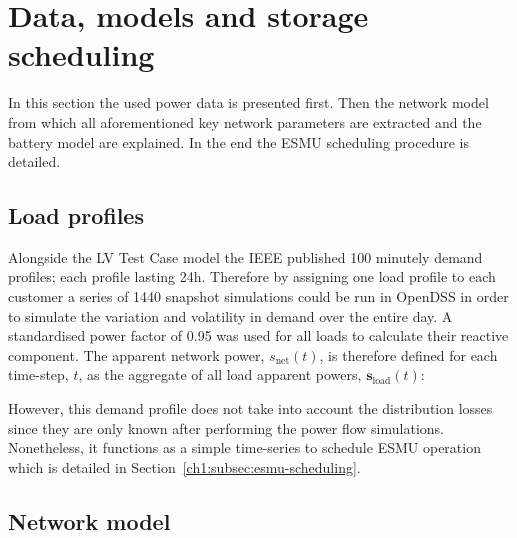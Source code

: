 \section{Data, models and storage scheduling}
\label{ch1:sec:data-and-network-models}

In this section the used power data is presented first.
Then the network model from which all aforementioned key network parameters are extracted and the battery model are explained.
In the end the ESMU scheduling procedure is detailed.

\subsection{Load profiles}
\label{ch1:subsec:load-profiles}


Alongside the LV Test Case model the IEEE published 100 minutely demand profiles; each profile lasting 24h.
Therefore by assigning one load profile to each customer a series of 1440 snapshot simulations could be run in OpenDSS in order to simulate the variation and volatility in demand over the entire day.
A standardised power factor of 0.95 was used for all loads to calculate their reactive component.
The apparent network power, $s_\text{net}(t)$, is therefore defined for each time-step, $t$, as the aggregate of all load apparent powers, $\textbf{s}_\text{load}(t)$:



However, this demand profile does not take into account the distribution losses since they are only known after performing the power flow simulations.
Nonetheless, it functions as a simple time-series to schedule ESMU operation which is detailed in Section~\ref{ch1:subsec:esmu-scheduling}.

\subsection{Network model}
\label{ch1:subsec:standardised-network-model}

